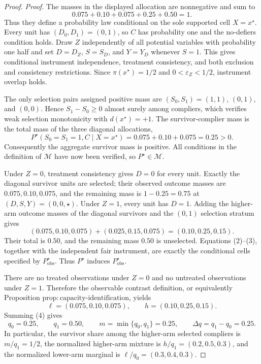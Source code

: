 \documentclass{article}
\begin{document}
\begin{proof}
\noindent\textit{Proof.}
The masses in the displayed allocation are nonnegative and sum to
\[
0.075+0.10+0.075+0.25+0.50=1.
\tag{1}
\]
Thus they define a probability law conditional on the sole supported cell
\(X=x^{\star}\).  Every unit has \((D_0,D_1)=(0,1)\), so \(C\) has
probability one and the no-defiers condition holds.  Draw \(Z\) independently
of all potential variables with probability one half and set \(D=D_Z\),
\(S=S_D\), and \(Y=Y_D\) whenever \(S=1\).  This gives conditional
instrument independence, treatment consistency, and both exclusion and
consistency restrictions.  Since \(\pi(x^{\star})=1/2\) and
\(0<\varepsilon_Z<1/2\), instrument overlap holds.

The only selection pairs assigned positive mass are \((S_0,S_1)=(1,1)\),
\((0,1)\), and \((0,0)\).  Hence \(S_1-S_0\ge0\) almost surely among
compliers, which verifies weak selection monotonicity with
\(d(x^{\star})=+1\).  The survivor-complier mass is the total mass of the
three diagonal allocations,
\[
P^{\star}(S_0=S_1=1,C\mid X=x^{\star})
=0.075+0.10+0.075=0.25>0.
\tag{2}
\]
Consequently the aggregate survivor mass is positive.  All conditions in
the definition of \(\mathcal M\) have now been verified, so
\(P^{\star}\in\mathcal M\).

Under \(Z=0\), treatment consistency gives \(D=0\) for every unit.
Exactly the diagonal survivor units are selected; their observed outcome
masses are \(0.075,0.10,0.075\), and the remaining mass is
\(1-0.25=0.75\) at \((D,S,Y)=(0,0,\star)\).  Under \(Z=1\), every unit
has \(D=1\).  Adding the higher-arm outcome masses of the diagonal
survivors and the \((0,1)\) selection stratum gives
\[
(0.075,0.10,0.075)+(0.025,0.15,0.075)
=(0.10,0.25,0.15).
\tag{3}
\]
Their total is \(0.50\), and the remaining mass \(0.50\) is unselected.
Equations (2)--(3), together with the independent fair instrument, are
exactly the conditional cells specified by \(P_{\mathrm{obs}}^{\star}\).
Thus \(P^{\star}\) induces \(P_{\mathrm{obs}}^{\star}\).

There are no treated observations under \(Z=0\) and no untreated
observations under \(Z=1\).  Therefore the observable contrast definition,
or equivalently Proposition
\(\mathrm{prop{:}capacity\text{-}identification}\), yields
\[
\ell=(0.075,0.10,0.075),\qquad
h=(0.10,0.25,0.15).
\tag{4}
\]
Summing (4) gives
\[
q_0=0.25,\qquad q_1=0.50,\qquad
m=\min\{q_0,q_1\}=0.25,
\qquad \Delta q=q_1-q_0=0.25.
\tag{5}
\]
In particular, the survivor share among the higher-arm selected compliers
is \(m/q_1=1/2\), the normalized higher-arm mixture is
\(h/q_1=(0.2,0.5,0.3)\), and the normalized lower-arm marginal is
\(\ell/q_0=(0.3,0.4,0.3)\).


\end{proof}
\end{document}
